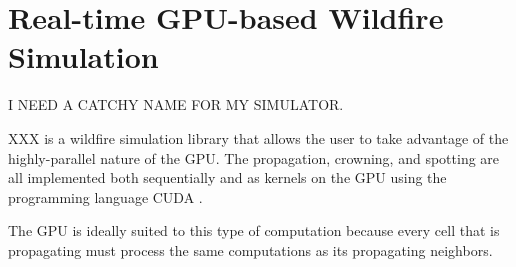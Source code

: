 \chapter{Real-time GPU-based Wildfire Simulation}
\label{chapter:gpuSim}
I NEED A CATCHY NAME FOR MY SIMULATOR. 

XXX is a wildfire simulation library that allows the user to take advantage of the highly-parallel nature of the GPU. The propagation, crowning, and spotting are all implemented both sequentially and as kernels on the GPU using the programming language CUDA \cite{cuda}. 

The GPU is ideally suited to this type of computation because every cell that is propagating must process the same computations as its propagating neighbors. 

